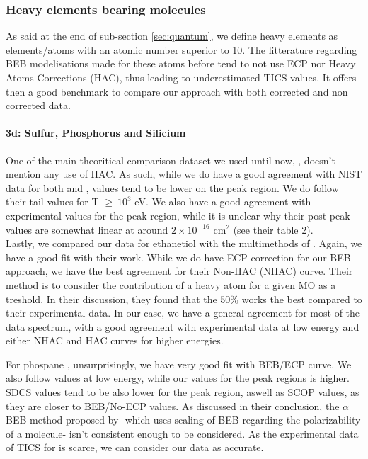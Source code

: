 \documentclass[article,preview]{planetary}
\newcommand{\sn}[2]{\ensuremath{#1\times 10^{#2}}}
\begin{document}
\subsubsection{Heavy elements bearing molecules}\label{subsub:heavy}
As said at the end of  sub-section \ref{sec:quantum}, we define heavy elements as elements/atoms with an atomic number superior to 10. The litterature regarding BEB modelisations made for these atoms before \textcite{huoUseRelativisticEffective2000} tend to not use ECP nor Heavy Atoms Corrections (HAC), thus leading to underestimated TICS values. It offers then a good benchmark to compare our approach with both corrected and non corrected data.
\paragraph{3d: Sulfur, Phosphorus and Silicium}
One of the main theoritical comparison dataset we used until now, \textcite{gachesAstrochemistryLowenergyElectron2024}, doesn't mention any use of HAC. As such, while we do have a good agreement with NIST data for both   and , \textcite{gachesAstrochemistryLowenergyElectron2024} values tend to be lower on the peak region. We do follow their tail values for T $\geq~10^3$ eV.  We also have a good agreement with \textcite{raoElectronImpactIonization1993} experimental values for the peak region, while it is unclear why their post-peak values are somewhat linear at around \sn{2}{-16} cm$^2$ (see their table 2).\\
Lastly, we compared our data for ethanetiol  with the multimethods of \textcite{zhouTotalElectronIonization2019}. Again, we have a good fit with their work. While we do have ECP correction for our BEB approach, we have the best agreement for their Non-HAC (NHAC) curve. Their method is to consider the contribution of a heavy atom for a given MO as a treshold. In their discussion, they found that the 50\% works the best compared to their experimental data. In our case, we have a general agreement for most of the data spectrum, with a good agreement with experimental data at low energy and either NHAC and HAC curves for higher energies. 

For phospane , unsurprisingly, we have very good fit with \textcite{gravesEfficientCalculationElectron2021} BEB/ECP curve. We also follow \textcite{markIonizationPhosphineDeuterated1977} values at low energy, while our values for the peak regions is higher. \textcite{kumarElectronIonizationCross2014} SDCS values tend to be also lower for the peak region, aswell as \textcite{vinodkumarElectronImpactTotal2011} SCOP values, as they are closer to \textcite{gravesEfficientCalculationElectron2021} BEB/No-ECP values. As discussed in their conclusion, the $\alpha$BEB method proposed by \textcite{gravesEfficientCalculationElectron2021} -which uses scaling of BEB regarding the polarizability of a molecule- isn't consistent enough to be considered. As the experimental data of TICS for  is scarce, we can consider our data as accurate.  
\end{document}
